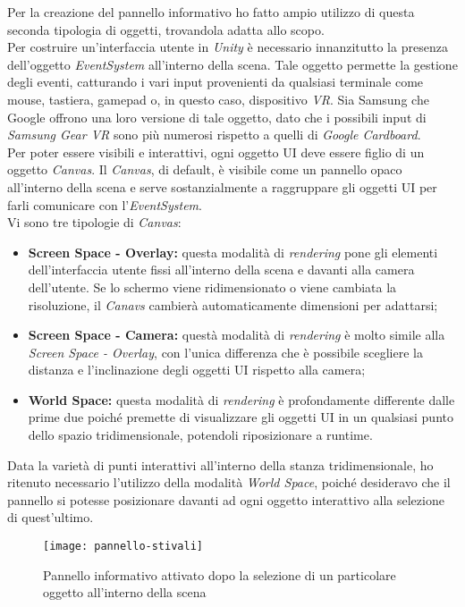 Per la creazione del pannello informativo ho fatto ampio utilizzo di questa seconda tipologia di oggetti, trovandola adatta allo scopo. \\
Per costruire un'interfaccia utente in \textit{Unity} è necessario innanzitutto la presenza dell'oggetto \textit{EventSystem} all'interno della scena. Tale oggetto permette la gestione degli eventi, catturando i vari input provenienti da qualsiasi terminale come mouse, tastiera, gamepad o, in questo caso, dispositivo \textit{VR}. Sia Samsung che Google offrono una loro versione di tale oggetto, dato che i possibili input di \textit{Samsung Gear VR} sono più numerosi rispetto a quelli di \textit{Google Cardboard}. \\
Per poter essere visibili e interattivi, ogni oggetto UI deve essere figlio di un oggetto \textit{Canvas}. Il \textit{Canvas}, di default, è visibile come un pannello opaco all'interno della scena e serve sostanzialmente a raggruppare gli oggetti UI per farli comunicare con l'\textit{EventSystem}. \\
Vi sono tre tipologie di \textit{Canvas}:

\begin{itemize}
	\item \textbf{Screen Space - Overlay:} questa modalità di \textit{rendering} pone gli elementi dell'interfaccia utente fissi all'interno della scena e davanti alla camera dell'utente. Se lo schermo viene ridimensionato o viene cambiata la risoluzione, il \textit{Canavs} cambierà automaticamente dimensioni per adattarsi;
	\item \textbf{Screen Space - Camera:} questà modalità di \textit{rendering} è molto simile alla \textit{Screen Space - Overlay}, con l'unica differenza che è possibile scegliere la distanza e l'inclinazione degli oggetti UI rispetto alla camera;
	\item \textbf{World Space:} questa modalità di \textit{rendering} è profondamente differente dalle prime due poiché premette di visualizzare gli oggetti UI in un qualsiasi punto dello spazio tridimensionale, potendoli riposizionare a runtime.
\end{itemize}

Data la varietà di punti interattivi all'interno della stanza tridimensionale, ho ritenuto necessario l'utilizzo della modalità \textit{World Space}, poiché desideravo che il pannello si potesse posizionare davanti ad ogni oggetto interattivo alla selezione di quest'ultimo.

\label{Pannello informativo}
\begin{figure}[ht]
	\begin{center}
		\texttt{[image: pannello-stivali]}
		\caption{Pannello informativo attivato dopo la selezione di un particolare oggetto all'interno della scena}
	\end{center}
\end{figure}
\FloatBarrier

